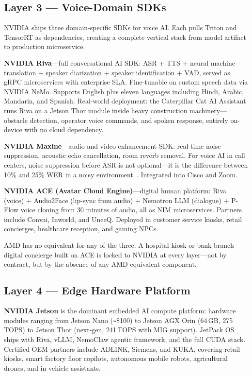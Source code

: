 \documentclass[blind]{gtac}
\begin{document}
\subsection{Layer 3 --- Voice-Domain SDKs}

NVIDIA ships three domain-specific SDKs for voice AI. Each pulls Triton and TensorRT as dependencies, creating a complete vertical stack from model artifact to production microservice.

\textbf{NVIDIA Riva}---full conversational AI SDK: ASR + TTS + neural machine translation + speaker diarization + speaker identification + VAD, served as gRPC microservices with enterprise SLA. Fine-tunable on custom speech data via NVIDIA NeMo. Supports English plus eleven languages including Hindi, Arabic, Mandarin, and Spanish. Real-world deployment: the Caterpillar Cat AI Assistant runs Riva on a Jetson Thor module inside heavy construction machinery---obstacle detection, operator voice commands, and spoken response, entirely on-device with no cloud dependency.

\textbf{NVIDIA Maxine}---audio and video enhancement SDK: real-time noise suppression, acoustic echo cancellation, room reverb removal. For voice AI in call centers, noise suppression before ASR is not optional---it is the difference between 10\% and 25\% WER in a noisy environment~\cite{whisper_wer}. Integrated into Cisco and Zoom.

\textbf{NVIDIA ACE (Avatar Cloud Engine)}---digital human platform: Riva (voice) + Audio2Face (lip-sync from audio) + Nemotron LLM (dialogue) + P-Flow voice cloning from 30 minutes of audio, all as NIM microservices. Partners include Convai, Inworld, and UneeQ. Deployed in customer service kiosks, retail concierges, healthcare reception, and gaming NPCs.

AMD has no equivalent for any of the three. A hospital kiosk or bank branch digital concierge built on ACE is locked to NVIDIA at every layer---not by contract, but by the absence of any AMD-equivalent component.

\subsection{Layer 4 --- Edge Hardware Platform}

\textbf{NVIDIA Jetson} is the dominant embedded AI compute platform: hardware modules ranging from Jetson Nano (\texttt{\textasciitilde}\$100) to Jetson AGX Orin (64\,GB, 275\,TOPS) to Jetson Thor (next-gen, 241\,TOPS with MIG support). JetPack OS ships with Riva, vLLM, NemoClaw agentic framework, and the full CUDA stack. Certified OEM partners include ADLINK, Siemens, and KUKA, covering retail kiosks, smart factory floor copilots, autonomous mobile robots, agricultural drones, and in-vehicle assistants.
\end{document}
